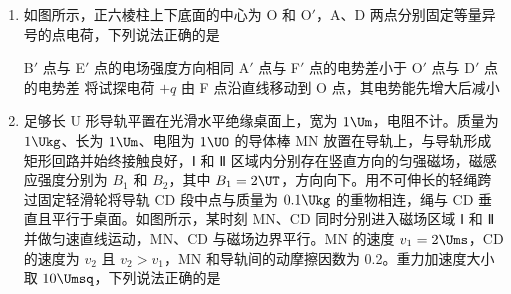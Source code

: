 \documentclass[\gkver]{gaokaozhenti}
\begin{document}
\begin{enumerate}
{解得 $\varphi_{a} = -\frac{\pi}{6}$ 或者 $\varphi_{a} = -\frac{5\pi}{6}$（由图中运动方向舍去），$\varphi_{b} = \frac{\pi}{3}$ 或者 $\varphi_{b} = \frac{2\pi}{3}$

当第二次经过 B 点时 $\varphi_{b} = \frac{2\pi}{3}$，则

$\frac{\frac{2}{3}\pi - \left(-\frac{\pi}{6}\right)}{2\pi}T = t$

解得 $T = \frac{12}{5}t$

此时位移关系为 $\frac{\sqrt{3}}{2}A + \frac{1}{2}A = L$

解得 $A = \frac{2L}{\sqrt{3} + 1}$

C 正确 D 错误；

故选 BC。
}

\item
如图所示，正六棱柱上下底面的中心为 O 和 O$'$，A、D 两点分别固定等量异号的点电荷，下列说法正确的是


{B$'$ 点与 E$'$ 点的电场强度方向相同}
{A$'$ 点与 F$'$ 点的电势差小于 O$'$ 点与 D$'$ 点的电势差}
{将试探电荷 $+ q$ 由 F 点沿直线移动到 O 点，其电势能先增大后减小}


\item
足够长 U 形导轨平置在光滑水平绝缘桌面上，宽为 $1 \Um$，电阻不计。质量为 $1 \Ukg$、长为 $1 \Um$、电阻为 $1 \UO$ 的导体棒 MN 放置在导轨上，与导轨形成矩形回路并始终接触良好，Ⅰ 和 Ⅱ 区域内分别存在竖直方向的匀强磁场，磁感应强度分别为 $B_{1}$ 和 $B_{2}$，其中 $B_{1} = 2 \UT$，方向向下。用不可伸长的轻绳跨过固定轻滑轮将导轨 CD 段中点与质量为 $0.1 \Ukg$ 的重物相连，绳与 CD 垂直且平行于桌面。如图所示，某时刻 MN、CD 同时分别进入磁场区域 Ⅰ 和 Ⅱ 并做匀速直线运动，MN、CD 与磁场边界平行。MN 的速度 $v_{1} = 2 \Ums$，CD 的速度为 $v_{2}$ 且 $v_{2} > v_{1}$，MN 和导轨间的动摩擦因数为 0.2。重力加速度大小取 $10 \Umsq$，下列说法正确的是


\end{enumerate}
\end{document}
